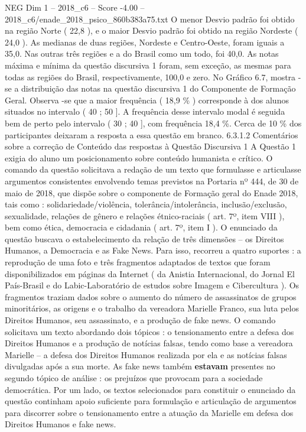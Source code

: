 \begin{textsample}{NEG Dim 1 – 2018\_c6 – Score -4.00 – 2018\_c6/enade\_2018\_psico\_860b383a75.txt}
O menor Desvio padrão foi obtido na região Norte ( 22,8 ), e o maior Desvio padrão foi obtido na região Nordeste ( 24,0 ).
As medianas de duas regiões, Nordeste e Centro-Oeste, foram iguais a 35,0.
Nas outras três regiões e a do Brasil como um todo, foi 40,0.
As notas máxima e mínima da questão discursiva 1 foram, sem exceção, as mesmas para todas as regiões do Brasil, respectivamente, 100,0 e zero.
No Gráfico 6.7, mostra -se a distribuição das notas na questão discursiva 1 do Componente de Formação Geral.
Observa -se que a maior frequência ( 18,9 \% ) corresponde à dos alunos situados no intervalo ( 40 ; 50 ].
A frequência desse intervalo modal é seguida bem de perto pelo intervalo ( 30 ; 40 ], com frequência 18,4 \%.
Cerca de 10 \% dos participantes deixaram a resposta a essa questão em branco. 6.3.1.2 Comentários sobre a correção de Conteúdo das respostas à Questão Discursiva 1 A Questão 1 exigia do aluno um posicionamento sobre conteúdo humanista e crítico.
O comando da questão solicitava a redação de um texto que formulasse e articulasse argumentos consistentes envolvendo temas previstos na Portaria nº 444, de 30 de maio de 2018, que dispõe sobre o componente de Formação geral do Enade 2018, tais como : solidariedade/violência, tolerância/intolerância, inclusão/exclusão, sexualidade, relações de gênero e relações étnico-raciais ( art. 7º, item VIII ), bem como ética, democracia e cidadania ( art. 7º, item I ).
O enunciado da questão buscava o estabelecimento da relação de três dimensões – os Direitos Humanos, a Democracia e as Fake News.
Para isso, recorreu a quatro suportes : a reprodução de uma foto e três fragmentos adaptados de textos que foram disponibilizados em páginas da Internet ( da Anistia Internacional, do Jornal El País-Brasil e do Labic-Laboratório de estudos sobre Imagem e Cibercultura ).
Os fragmentos traziam dados sobre o aumento do número de assassinatos de grupos minoritários, as origens e o trabalho da vereadora Marielle Franco, sua luta pelos Direitos Humanos, seu assassinato, e a produção de fake news.
O comando solicitava um texto abordando dois tópicos : o tensionamento entre a defesa dos Direitos Humanos e a produção de notícias falsas, tendo como base a vereadora Marielle – a defesa dos Direitos Humanos realizada por ela e as notícias falsas divulgadas após a sua morte.
As fake news também \textbf{estavam} presentes no segundo tópico de análise : os prejuízos que provocam para a sociedade democrática.
Por um lado, os textos selecionados para constituir o enunciado da questão continham apoio suficiente para formulação e articulação de argumentos para discorrer sobre o tensionamento entre a atuação da Marielle em defesa dos Direitos Humanos e fake news.

\end{textsample}
